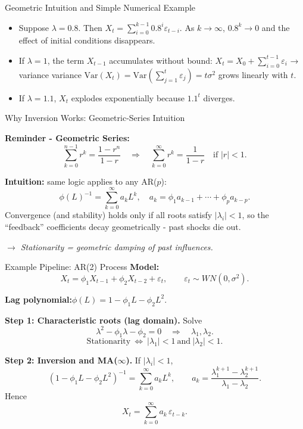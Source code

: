 \documentclass{beamer}
\begin{document}

\begin{frame}{Geometric Intuition and Simple Numerical Example}
\begin{itemize}
    \item Suppose $\lambda = 0.8$.  
          Then $X_t =  \sum_{i=0}^{k-1} 0.8^i \varepsilon_{t-i}$.  
          As $k \to \infty$, $0.8^k \to 0$ and the effect of initial conditions disappears.
    \item If $\lambda = 1$, the term $X_{t-1}$ accumulates without bound:  
          $X_t = X_0 + \sum_{i=0}^{t-1}\varepsilon_i$ → variance variance $\mathrm{Var}(X_t)= \mathrm{Var}(\sum_{j=1}^t \varepsilon_j)=t\sigma^2$ grows linearly with $t$.
    \item If $\lambda = 1.1$, $X_t$ explodes exponentially because $1.1^t$ diverges.
\end{itemize}

\end{frame}


\begin{frame}{Why Inversion Works: Geometric-Series Intuition}
\small

\textbf{Reminder - Geometric Series:}
\[
\sum_{k=0}^{n-1} r^k = \frac{1 - r^n}{1 - r}
\quad \Rightarrow \quad
\sum_{k=0}^{\infty} r^k = \frac{1}{1 - r} \quad \text{if } |r| < 1.
\]

\medskip
\textbf{Intuition:} same logic applies to any AR($p$):
\[
\phi(L)^{-1} = \sum_{k=0}^{\infty} a_k L^k, \quad 
a_k = \phi_1 a_{k-1} + \cdots + \phi_p a_{k-p}.
\]
Convergence (and stability) holds only if all roots satisfy $|\lambda_i| < 1$,
so the “feedback” coefficients decay geometrically - past shocks die out.

\bigskip
\centering
\textit{$\to$ Stationarity = geometric damping of past influences.}
\end{frame}

\begin{frame}{Example Pipeline: AR(2) Process}
\smallskip
\textbf{Model:}
\[
X_t=\phi_1 X_{t-1}+\phi_2 X_{t-2}+\varepsilon_t,\qquad \varepsilon_t\sim WN(0,\sigma^2).
\]

\textbf{Lag polynomial:}\quad \(\phi(L)=1-\phi_1 L-\phi_2 L^2\).

\textbf{Step 1: Characteristic roots (lag domain).}
Solve
\[
\lambda^2-\phi_1\lambda-\phi_2=0 \quad\Rightarrow\quad \lambda_1,\lambda_2.
\]
\[
\text{Stationarity} \ \Longleftrightarrow\ |\lambda_1|<1\ \text{and}\ |\lambda_2|<1.
\]

\textbf{Step 2: Inversion and MA($\infty$).}
If $|\lambda_i|<1$,
\[
(1-\phi_1 L-\phi_2 L^2)^{-1}=\sum_{k=0}^{\infty} a_k L^k,\qquad
a_k=\frac{\lambda_1^{k+1}-\lambda_2^{k+1}}{\lambda_1-\lambda_2}.
\]
Hence
\[
X_t=\sum_{k=0}^{\infty} a_k\,\varepsilon_{t-k}.
\]
\end{frame}
\end{document}
